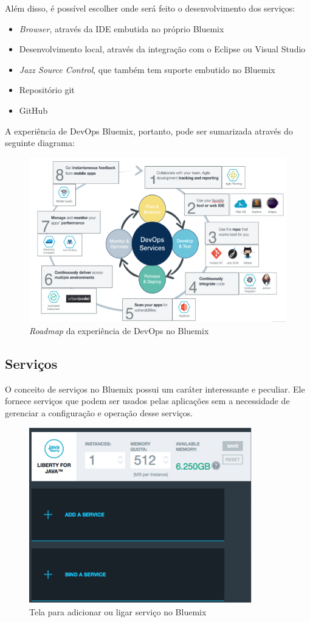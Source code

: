 Além disso, é possível escolher onde será feito o desenvolvimento dos serviços:
\begin{itemize}
  \item \textit{Browser}, através da IDE embutida no próprio Bluemix
  \item Desenvolvimento local, através da integração com o Eclipse ou Visual Studio
  \item \textit{Jazz Source Control}, que também tem suporte embutido no Bluemix
  \item Repositório git
  \item GitHub
\end{itemize}
A experiência de DevOps Bluemix, portanto, pode ser sumarizada através do seguinte diagrama:
\begin{figure}[!htb]
    \centering
    \includegraphics{imagens/roadmap}
    \caption{\textit{Roadmap} da experiência de DevOps no Bluemix}
    \label{Rotulo}
\end{figure}

\subsection{Serviços}

O conceito de serviços no Bluemix possui um caráter interessante e peculiar. Ele fornece serviços que podem ser usados pelas aplicações sem a necessidade de gerenciar a configuração e operação desse serviços.

\begin{figure}[!htb]
    \centering
    \includegraphics{imagens/servico}
    \caption{Tela para adicionar ou ligar serviço no Bluemix}
    \label{Rotulo}
\end{figure}

